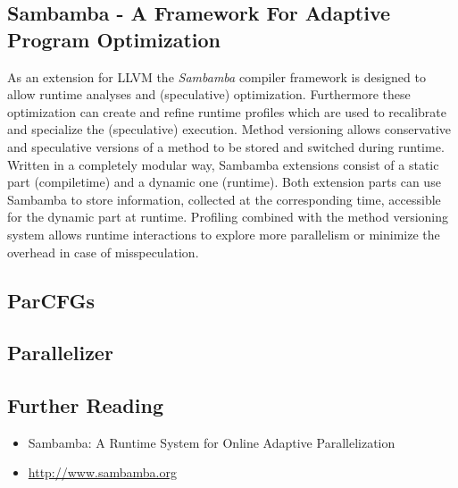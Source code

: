 \red
\begin{shaded}
\section{Sambamba - A Framework For Adaptive Program Optimization}
As an extension for LLVM the \textit{Sambamba} compiler framework is designed to
allow runtime analyses and (speculative) optimization.
Furthermore these optimization can create and refine runtime profiles which
are used to recalibrate and specialize the (speculative) execution. Method 
versioning allows conservative and speculative 
versions of a method to be stored and switched during runtime. 
Written in a completely modular way, Sambamba extensions consist 
of a static part (compiletime) and a dynamic one (runtime). 
Both extension parts can use Sambamba to store information,
collected at the corresponding time, accessible for the dynamic part at 
runtime.
Profiling combined with the method versioning system allows runtime interactions
to explore more parallelism or minimize the overhead in case of misspeculation. 

\subsection{ParCFGs}

\subsection{Parallelizer}

\subsection*{Further Reading}
\begin{itemize}
  \item Sambamba: A Runtime System for Online Adaptive Parallelization \cite{DBLP:conf/cc/StreitHZH12}  
  \item \url{http://www.sambamba.org} \nocite{StreitHZH12:Online}
\end{itemize}

\end{shaded}


